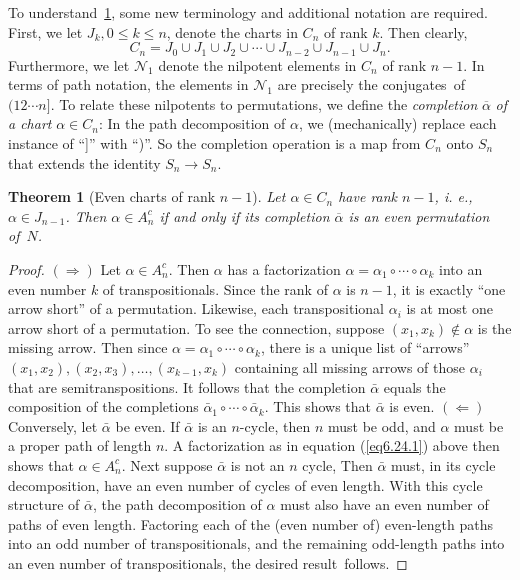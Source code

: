 \documentclass{surv-l}
\numberwithin{equation}{section}
\numberwithin{table}{section}
\numberwithin{figure}{section}
\theoremstyle{plain}
\newtheorem{theorem}[equation]{Theorem}
\theoremstyle{definition}
\begin{document}
To understand~\ref{thm6.25.1}, some new terminology and additional
notation are required. First, we let $J_{k}, 0\leq k\leq n$,
denote the charts in $C_{n}$ of rank $k$. Then clearly,
\[
C_{n}=J_{0}\cup J_{1}\cup J_{2}\cup\cdots\cup J_{n-2}\cup J_{n-1}\cup J_{n}.
\]
Furthermore, we let $\mathcal{N}_{1}$ denote the nilpotent
elements in $C_{n}$ of rank $n-1$. In terms of path notation, the
elements in $\mathcal{N}_{1}$ are precisely the conjugates~of
$(12\cdots n]$. To relate these nilpotents to permutations, we
define the \emph{completion} $\overline{\alpha}$ \emph{of a
chart} $\alpha\in C_{n}$: In the path decomposition of $\alpha$,
we (mechanically) replace each instance of ``]'' with ``)''. So
the completion operation is a map from $C_{n}$ onto $S_{n}$ that
extends the identity $S_{n}\rightarrow S_{n}$.

\begin{theorem}[Even charts of rank $n -1$]\label{thm6.25.1}
Let $\alpha\in C_{n}$ have rank $n-1$, i. e., $\alpha\in J_{n-1}$.
Then $\alpha\in A_{n}^{c}$ if and only if its completion
$\overline{\alpha}$ is an even permutation of~$N$.
\end{theorem}

\begin{proof} $(\Rightarrow)$ Let $\alpha\in A_{n}^{c}$. Then $\alpha$
has a factorization $\alpha=\alpha_{1}\circ \cdots\circ\alpha_{k}$
into an even number $k$ of transpositionals. Since the rank of
$\alpha$ is $n -1$, it is exactly ``one arrow short'' of a
permutation. Likewise, each transpositional $\alpha_{i}$ is at
most one arrow short of a permutation. To see the connection,
suppose $(x_{1}, x_{k})\not\in\alpha$ is the missing arrow. Then
since $\alpha=\alpha_{1}\circ\cdots \circ\alpha_{k}$, there is a
unique list of ``arrows'' $(x_{1}, x_{2}), (x_{2}, x_{3}),\ldots,
(x_{k-1}, x_{k})$ containing all missing arrows of those
$\alpha_{i}$ that are semitranspositions. It follows that the
completion $\bar{\alpha}$ equals the composition of the
completions $\bar{\alpha}_{1}\circ\cdots \circ\bar{\alpha}_{k}$.
This shows that $\bar{\alpha}$ is even. $(\Leftarrow)$ Conversely,
let $\bar{\alpha}$ be even. If $\bar{\alpha}$ is an $n$-cycle,
then $n$ must be odd, and $\alpha$ must be a proper path of length
$n$. A factorization as in equation (\ref{eq6.24.1}) above then
shows that $\alpha\in A_{n}^{c}$. Next suppose $\bar{\alpha}$ is
not an $n$ cycle, Then $\bar{\alpha}$ must, in its cycle
decomposition, have an even number of cycles of even length. With
this cycle structure of $\bar{\alpha}$, the path decomposition of
$\alpha$ must also have an even number of paths of even length.
Factoring each of the (even number of) even-length paths into an
odd number of transpositionals, and the remaining odd-length paths
into an even number of transpositionals, the desired
result~follows.
\end{proof}
\end{document}
